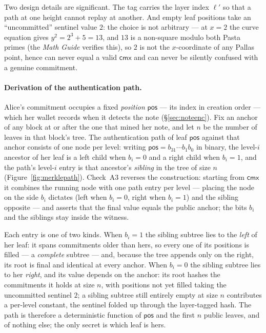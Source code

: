 \documentclass[11pt,a4paper]{article}
\theoremstyle{definition}
\newcommand{\cmx}{\mathsf{cmx}}
\begin{document}
Two design details are significant. The tag carries the layer
index $\ell'$ so that a path at one height cannot replay at another.
And empty leaf positions take an ``uncommitted'' sentinel value
$2$: the choice is not arbitrary --- at $x = 2$ the curve equation gives
$y^2 = 2^3 + 5 = 13$, and $13$ is a non-square modulo both Pasta primes (the
\emph{Math Guide} verifies this), so $2$ is not the $x$-coordinate of any
Pallas point, hence can never equal a valid $\cmx$ and can never be silently
confused with a genuine commitment.

\paragraph{Derivation of the authentication path.}
Alice's commitment occupies a fixed \emph{position} $\mathsf{pos}$ --- its
index in creation order --- which her wallet records when it detects the note
(\S\ref{sec:noteenc}). Fix an anchor of any block at or after the one that
mined her note, and let $n$ be the number of leaves in that block's tree. The
authentication path of leaf $\mathsf{pos}$ against that anchor consists of
one node per level: writing $\mathsf{pos} = b_{31} \cdots b_1 b_0$ in binary,
the level-$i$ ancestor of her leaf is a left child when $b_i = 0$ and a right
child when $b_i = 1$, and the path's level-$i$ entry is that ancestor's
\emph{sibling} in the tree of size $n$ (Figure~\ref{fig:merklepath}).
Check~A3 reverses the construction: starting from $\cmx$ it combines the
running node with one path entry per level --- placing the node on the side
$b_i$ dictates (left when $b_i = 0$, right when $b_i = 1$) and the sibling
opposite --- and asserts that the final value equals the public anchor; the
bits $b_i$ and the siblings stay inside the witness.

Each entry is one of two kinds. When $b_i = 1$ the sibling subtree lies to
the \emph{left} of her leaf: it spans commitments older than hers, so every
one of its positions is filled --- a \emph{complete} subtree --- and, because
the tree appends only on the right, its root is final and identical at every
anchor. When $b_i = 0$ the
sibling subtree lies to her \emph{right}, and its value depends on the
anchor: its root hashes the commitments it holds at size $n$, with positions
not yet filled taking the uncommitted sentinel $2$; a sibling subtree still
entirely empty at size $n$ contributes a per-level constant, the sentinel
folded up through the layer-tagged hash. The path is therefore a
deterministic function of $\mathsf{pos}$ and the first $n$ public leaves, and
of nothing else; the only secret is which leaf is hers.
\end{document}
